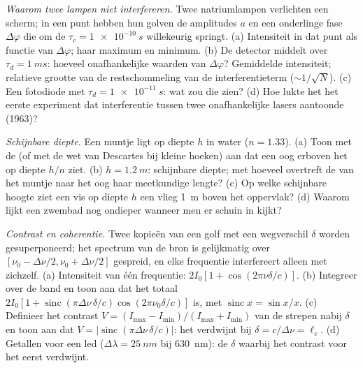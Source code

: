 \begin{exercise}[$\star\star$]\label{exo:b2:scalar-light-model:8}
\emph{Waarom twee lampen niet interfereren.} Twee natriumlampen verlichten
een scherm; in een punt hebben hun golven de amplitudes $a$ en een
onderlinge fase $\Delta\varphi$ die om de $\tau_c = \qty{1e-10}{s}$
willekeurig springt. (a) Intensiteit in dat punt als functie van
$\Delta\varphi$; haar maximum en minimum. (b) De detector middelt over
$\tau_d = \qty{1}{ms}$: hoeveel onafhankelijke waarden van $\Delta\varphi$?
Gemiddelde intensiteit; relatieve grootte van de restschommeling van de
interferentieterm ($\sim 1/\sqrt N$). (c) Een fotodiode met
$\tau_d = \qty{1e-11}{s}$: wat zou die zien? (d) Hoe lukte het het eerste
experiment dat interferentie tussen twee onafhankelijke lasers aantoonde
(1963)?
\end{exercise}

\begin{exercise}[$\star\star$]\label{exo:b2:scalar-light-model:9}
\emph{Schijnbare diepte.} Een muntje ligt op diepte $h$ in water
($n = 1.33$). (a) Toon met de  (of met de wet van
Descartes bij kleine hoeken) aan dat een oog erboven het op diepte $h/n$
ziet. (b) $h = \qty{1.2}{m}$: schijnbare diepte; met hoeveel overtreft de
 van het muntje naar het oog haar meetkundige lengte? (c)
Op welke schijnbare hoogte ziet een vis op diepte $h$ een vlieg \qty{1}{m}
boven het oppervlak? (d) Waarom lijkt een zwembad nog ondieper wanneer men
er schuin in kijkt?
\end{exercise}

\begin{exercise}[$\star\star\star$]\label{exo:b2:scalar-light-model:10}
\emph{Contrast en coherentie.} Twee kopieën van een golf met een wegverschil
$\delta$ worden gesuperponeerd; het spectrum van de bron is gelijkmatig over
$[\nu_0 - \Delta\nu/2, \nu_0 + \Delta\nu/2]$ gespreid, en elke frequentie
interfereert alleen met zichzelf. (a) Intensiteit van één frequentie:
$2I_0
[1 + \cos(2\pi\nu\delta/c)]$. (b) Integreer over de band en toon aan
dat het totaal
$2I_0[1 + \operatorname{sinc}(\pi\Delta\nu\,\delta/c)\cos(2\pi\nu_0\delta/c)]$
is, met $\operatorname{sinc}x = \sin x/x$. (c) Definieer het contrast
$V = (I_{\max} -
I_{\min})/(I_{\max} + I_{\min})$ van de strepen nabij
$\delta$ en toon aan dat
$V =
|\operatorname{sinc}(\pi\Delta\nu\,\delta/c)|$: het verdwijnt bij
$\delta = c/\Delta\nu = \ell_c$. (d) Getallen voor een led
($\Delta\lambda = \qty{25}{nm}$ bij \qty{630}{nm}): de $\delta$ waarbij het
contrast voor het eerst verdwijnt.
\end{exercise}

